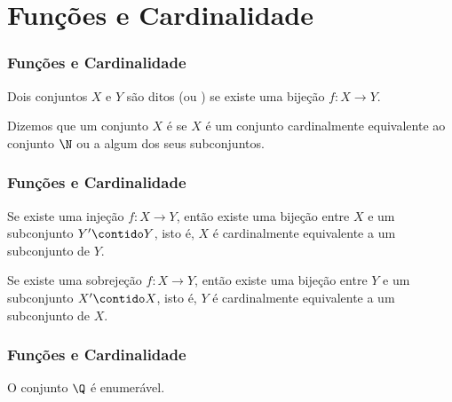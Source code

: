 \documentclass[10pt]{beamer}
\begin{document}
\section{Funções e Cardinalidade}
\begin{frame}
\frametitle{Funções e Cardinalidade} 

\begin{definicao}
Dois conjuntos $X$ e $Y$ são ditos 
(ou ) se existe uma bijeção $f : X \to Y$.
\end{definicao}

\begin{definicao}
Dizemos que um conjunto $X$ é  se $X$ é um conjunto
cardinalmente equivalente ao conjunto $\N$ ou a algum dos seus
subconjuntos.
\end{definicao}


\end{frame}




\begin{frame}
\frametitle{Funções e Cardinalidade} 

\begin{teorema}
Se existe uma injeção $f: X \to Y$, então existe uma bijeção entre
$X$ e um subconjunto $Y' \contido Y$, isto é, $X$ é cardinalmente
equivalente a um subconjunto de $Y$.
\end{teorema} \pause

\begin{teorema}
Se existe uma sobrejeção $f : X \to Y$, então existe uma bijeção
entre $Y$ e um subconjunto $X' \contido X$, isto é, $Y$ é
cardinalmente equivalente a um subconjunto de $X$.
\end{teorema}

\end{frame}


\begin{frame}
\frametitle{Funções e Cardinalidade} 

\begin{exemplo}
O conjunto $\Q$ é enumerável.
\end{exemplo}

\end{frame}
\end{document}
